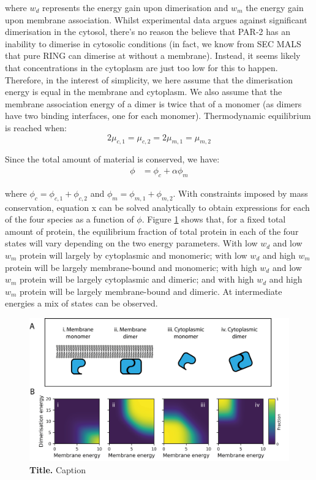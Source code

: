 \documentclass[12pt]{"article"}
\newcommand{\mycaption}[2]{\caption[#1]{\textbf{#1.} #2}}
\begin{document}
where $w_d$ represents the energy gain upon dimerisation and $w_m$ the energy gain upon membrane association. Whilst experimental data argues against significant dimerisation in the cytosol, there's no reason the believe that PAR-2 has an inability to dimerise in cytosolic conditions (in fact, we know from SEC MALS that pure RING can dimerise at without a membrane). Instead, it seems likely that concentrations in the cytoplasm are just too low for this to happen. Therefore, in the interest of simplicity, we here assume that the dimerisation energy is equal in the membrane and cytoplasm. We also assume that the membrane association energy of a dimer is twice that of a monomer (as dimers have two binding interfaces, one for each monomer). Thermodynamic equilibrium is reached when:
\begin{equation}
2\mu_{c,1} = \mu_{c,2} = 2\mu_{m,1} = \mu_{m,2}
\end{equation}

Since the total amount of material is conserved, we have:
\begin{align}
\phi &= \phi_c + \alpha\phi_m
\end{align}

where $\phi_c = \phi_{c,1} + \phi_{c,2}$ and $\phi_m = \phi_{m,1} + \phi_{m,2}$. With constraints imposed by mass conservation, equation x can be solved analytically to obtain expressions for each of the four species as a function of $\phi$. Figure \ref{fig:thermodynamic_model_species} shows that, for a fixed total amount of protein, the equilibrium fraction of total protein in each of the four states will vary depending on the two energy parameters. With low $w_d$ and low $w_m$ protein will largely by cytoplasmic and monomeric; with low $w_d$ and high $w_m$ protein will be largely membrane-bound and monomeric; with high $w_d$ and low $w_m$ protein will be largely cytoplasmic and dimeric; and with high $w_d$ and high $w_m$ protein will be largely membrane-bound and dimeric. At intermediate energies a mix of states can be observed.\\

\begin{figure}[!h]
\includegraphics[scale=0.9]{thermodynamic_model_species}
\setlength{\abovecaptionskip}{20pt}
\centering
\mycaption{Title}{Caption}
\label{fig:thermodynamic_model_species}
\end{figure}
\end{document}
